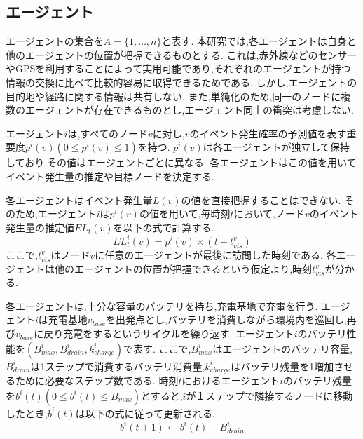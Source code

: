 \documentclass[12pt,a4j,twoside]{jarticle}
\begin{document}
\subsection{エージェント}
エージェントの集合を$A=\{1, \dots ,n\}$と表す.
本研究では,各エージェントは自身と他のエージェントの位置が把握できるものとする.
これは,赤外線などのセンサーやGPSを利用することによって実用可能であり,それぞれのエージェントが持つ情報の交換に比べて比較的容易に取得できるためである.
しかし,エージェントの目的地や経路に関する情報は共有しない.
また,単純化のため,同一のノードに複数のエージェントが存在できるものとし,エージェント同士の衝突は考慮しない.

\par
エージェント$i$は,すべてのノード$v$に対し,$v$のイベント発生確率の予測値を表す重要度$p^i(v) (0 \leq p^i(v) \leq 1)$を持つ.
$p^i(v)$は各エージェントが独立して保持しており,その値はエージェントごとに異なる.
各エージェントはこの値を用いてイベント発生量の推定や目標ノードを決定する.

\par
各エージェントはイベント発生量$L(v)$の値を直接把握することはできない.
そのため,エージェント$i$は$p^i(v)$の値を用いて,毎時刻$t$において,ノード$v$のイベント発生量の推定値$EL_t(v)$を以下の式で計算する.
\begin{equation}
  EL^i_t(v) = p^i(v) \times (t - t^v_{vis})
\end{equation}
ここで,$t^v_{vis}$はノード$v$に任意のエージェントが最後に訪問した時刻である.
各エージェントは他のエージェントの位置が把握できるという仮定より,時刻$t^v_{vis}$が分かる.

\par
各エージェントは,十分な容量のバッテリを持ち,充電基地で充電を行う.
エージェント$i$は充電基地$v_{base}$を出発点とし,バッテリを消費しながら環境内を巡回し,再び$v_{base}$に戻り充電をするというサイクルを繰り返す.
エージェント$i$のバッテリ性能を$(B^i_{max}, B^i_{drain}, k^i_{charge})$で表す.
ここで,$B^i_{max}$はエージェントのバッテリ容量,$B^i_{drain}$は1ステップで消費するバッテリ消費量,$k^i_{charge}$はバッテリ残量を1増加させるために必要なステップ数である.
時刻$t$におけるエージェント$i$のバッテリ残量を$b^i(t) (0 \leq b^i(t) \leq B_{max})$とすると,$i$が１ステップで隣接するノードに移動したとき,$b^i(t)$は以下の式に従って更新される.
\begin{equation}
  b^i(t+1) \gets b^i(t) - B^i_{drain}
\end{equation}
\end{document}
